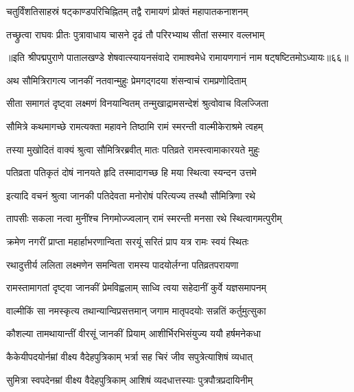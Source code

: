 \twolineshloka
{चतुर्विंशतिसाहस्रं षट्काण्डपरिचिह्नितम्}
{तद्वै रामायणं प्रोक्तं महापातकनाशनम्}%

\twolineshloka
{तच्छ्रुत्वा राघवः प्रीतः पुत्रावाधाय चासने}
{दृढं तौ परिरभ्याथ सीतां सस्मार वल्लभाम्}%

{॥इति श्रीपद्मपुराणे पातालखण्डे शेषवात्स्यायनसंवादे रामाश्वमेधे रामायणगानं नाम षट्षष्टितमोऽध्यायः॥६६॥}

\resetShloka


\twolineshloka
{अथ सौमित्रिरागत्य जानकीं नतवान्मुहुः}
{प्रेमगद्गदया शंसन्वाचं रामप्रणोदिताम्}%

\twolineshloka
{सीता समागतं दृष्ट्वा लक्ष्मणं विनयान्वितम्}
{तन्मुखाद्रामसन्देशं श्रुत्वोवाच विलज्जिता}%

\twolineshloka
{सौमित्रे कथमागच्छे रामत्यक्ता महावने}
{तिष्ठामि रामं स्मरन्ती वाल्मीकेराश्रमे त्वहम्}%

\twolineshloka
{तस्या मुखोदितं वाक्यं श्रुत्वा सौमित्रिरब्रवीत्}
{मातः पतिव्रते रामस्त्वामाकारयते मुहुः}%

\twolineshloka
{पतिव्रता पतिकृतं दोषं नानयते हृदि}
{तस्मादागच्छ हि मया स्थित्वा स्यन्दन उत्तमे}%

\twolineshloka
{इत्यादि वचनं श्रुत्वा जानकी पतिदेवता}
{मनोरोषं परित्यज्य तस्थौ सौमित्रिणा रथे}%

\twolineshloka
{तापसीः सकला नत्वा मुनींश्च निगमोज्ज्वलान्}
{रामं स्मरन्ती मनसा रथे स्थित्वागमत्पुरीम्}%

\twolineshloka
{क्रमेण नगरीं प्राप्ता महार्हाभरणान्विता}
{सरयूं सरितं प्राप यत्र रामः स्वयं स्थितः}%

\twolineshloka
{रथादुत्तीर्य ललिता लक्ष्मणेन समन्विता}
{रामस्य पादयोर्लग्ना पतिव्रतपरायणा}%

\twolineshloka
{रामस्तामागतां दृष्ट्वा जानकीं प्रेमविह्वलाम्}
{साध्वि त्वया सहेदानीं कुर्वे यज्ञसमापनम्}%

\twolineshloka
{वाल्मीकिं सा नमस्कृत्य तथान्यान्विप्रसत्तमान्}
{जगाम मातृपदयोः सन्नतिं कर्तुमुत्सुका}%

\twolineshloka
{कौशल्या तामथायान्तीं वीरसूं जानकीं प्रियाम्}
{आशीर्भिरभिसंयुज्य ययौ हर्षमनेकधा}%

\twolineshloka
{कैकेयीपदयोर्नम्रां वीक्ष्य वैदेहपुत्रिकाम्}
{भर्त्रा सह चिरं जीव सपुत्रेत्याशिषं व्यधात्}%

\twolineshloka
{सुमित्रा स्वपदेनम्रां वीक्ष्य वैदेहपुत्रिकाम्}
{आशिषं व्यदधात्तस्याः पुत्रपौत्रप्रदायिनीम्}%

